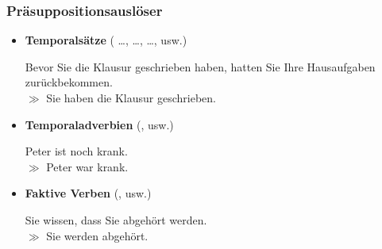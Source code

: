 \begin{frame}
\frametitle{Präsuppositionsauslöser}

\begin{itemize}
	\item \textbf{Temporalsätze} (\zB {} \dots,  \dots,  \dots, usw.)
	
	\ea Bevor Sie die Klausur geschrieben haben, hatten Sie Ihre Hausaufgaben zurückbekommen. \\ $\gg$ Sie haben die Klausur geschrieben.
	\z
	
	\item \textbf{Temporaladverbien} (\zB {}, usw.)
	
	\ea Peter ist noch krank.\\ $\gg$ Peter war krank.
	\z
	
	\item \textbf{Faktive Verben} (\zB {}, usw.)
	
	\ea Sie wissen, dass Sie abgehört werden.\\ $\gg$ Sie werden abgehört.
	\z

\end{itemize}

\end{frame}

%
%	
%
%		
%		
%		
%
%		
%			
%				
%					
%
%


